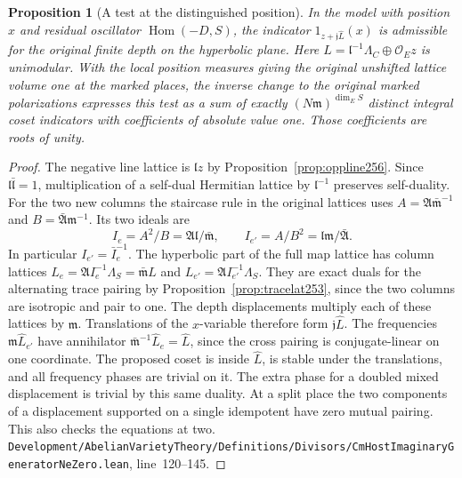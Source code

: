 \documentclass[a4paper,11pt]{article}
\newtheorem{proposition}{Proposition}[section]
\theoremstyle{definition}
\theoremstyle{remark}
\newcommand{\srcloc}[2]{{\small\nolinkurl{#1.lean}}, line~#2}
\numberwithin{equation}{section}
\begin{document}
\begin{proposition}[A test at the distinguished position]\leavevmode
\label{prop:shell263}
In the model with position \(x\) and residual oscillator
\(\operatorname{Hom}(-D,S)\), the indicator
\(1_{z+\mathfrak j\widehat L}(x)\) is admissible for the
original finite depth on the hyperbolic plane. Here
\(L=\mathfrak l^{-1}\Lambda_C\oplus\mathcal O_E z\) is
unimodular. With the local position measures giving the original
unshifted lattice volume one at the marked places, the inverse
change to the original marked polarizations expresses this
test as a sum of exactly
\((N\mathfrak m)^{\dim_E S}\) distinct integral coset indicators
with coefficients of absolute value one. Those coefficients
are roots of unity.
\end{proposition}
\begin{proof}
The negative line lattice is \(\mathfrak l z\) by
Proposition~\ref{prop:oppline256}. Since
\(\mathfrak l\bar{\mathfrak l}=1\), multiplication of a
self-dual Hermitian lattice by \(\mathfrak l^{-1}\) preserves
self-duality. For the two new columns the staircase rule in
the original lattices uses
\(A=\mathfrak A\bar{\mathfrak m}^{-1}\) and
\(B=\bar{\mathfrak A}\mathfrak m^{-1}\). Its two ideals are
\[
 I_e=A^2/B=\mathfrak A\mathfrak l/\bar{\mathfrak m},
 \qquad I_{e'}=A/B^2=\mathfrak l\mathfrak m/\bar{\mathfrak A}.
\]
In particular \(I_{e'}=\bar I_e^{-1}\). The hyperbolic part
of the full map lattice has column lattices
\(L_e=\mathfrak A I_e^{-1}\Lambda_S=\bar{\mathfrak m}L\)
and \(L_{e'}=\mathfrak A I_{e'}^{-1}\Lambda_S\).
They are exact duals for the alternating trace pairing by
Proposition~\ref{prop:tracelat253}, since the two columns are
isotropic and pair to one. The depth displacements multiply
each of these lattices by \(\mathfrak m\). Translations of
the \(x\)-variable therefore form \(\mathfrak j\widehat L\).
The frequencies \(\mathfrak m\widehat L_{e'}\) have annihilator
\(\bar{\mathfrak m}^{-1}\widehat L_e=\widehat L\), since
the cross pairing is conjugate-linear on one coordinate.
The proposed coset is inside \(\widehat L\), is stable under
the translations, and all frequency phases are trivial on it.
The extra phase for a doubled mixed displacement is trivial
by this same duality. At a split place the two components
of a displacement supported on a single idempotent have
zero mutual pairing. This also checks the equations at two.
\srcloc{Development/AbelianVarietyTheory/Definitions/Divisors/CmHostImaginaryGeneratorNeZero}{120--145}.


\end{proof}
\end{document}
